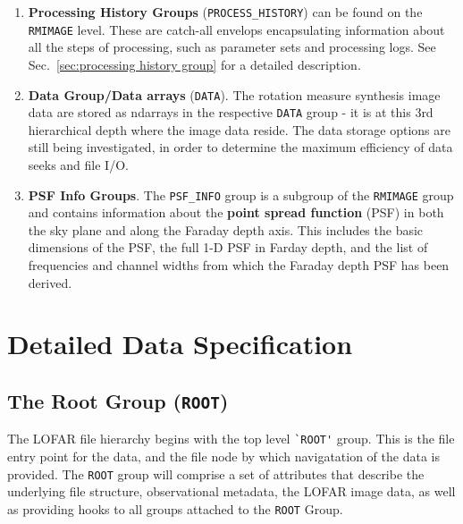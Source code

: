\documentclass[a4paper,10pt,bibtotoc]{scrartcl}
\begin{document}
\begin{enumerate}
\item \textbf{Processing History Groups} (\verb|PROCESS_HISTORY|)
  can be found on the \texttt{RMIMAGE} level. These are catch-all
  envelops encapsulating information about all the steps of
  processing, such as parameter sets and processing logs. See
  Sec.~\ref{sec:processing history group} for a detailed description.

\item \textbf{Data Group/Data arrays} (\verb|DATA|). The rotation measure synthesis image data are stored as ndarrays in the respective \texttt{DATA} group - it is at this 3rd hierarchical depth where the image data reside. The data storage options are still being investigated, in order to determine the maximum efficiency of data seeks and file I/O. 

\item \textbf{PSF Info Groups}. The \verb|PSF_INFO| group is a subgroup of the \texttt{RMIMAGE} group and contains information about the \textbf{point spread function} (PSF) in both the sky plane and along the Faraday depth axis. This includes the basic dimensions of the PSF, the full 1-D PSF in Farday depth, and the list of frequencies and channel widths from which the Faraday depth PSF has been derived.

\end{enumerate}


\section{Detailed Data Specification}
\label{sec:detailed structure}



\subsection{The Root Group ({\tt ROOT})}
\label{sec:root group}

The LOFAR file hierarchy begins with the top level \verb|`ROOT'| group.  This is the file entry point for the data, and the file node by which navigatation of the data is provided.  The \texttt{ROOT} group will comprise a set of attributes that describe the underlying file structure, observational metadata, the LOFAR image data, as well as providing hooks to all groups attached to the \texttt{ROOT} Group.   
\end{document}
